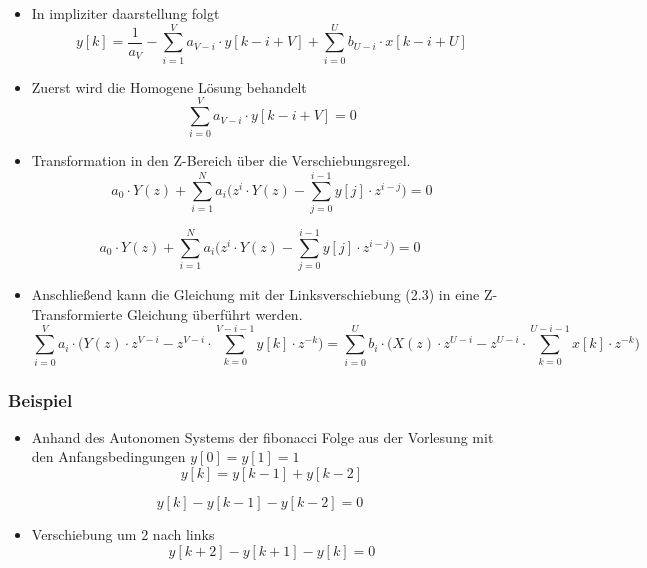 \documentclass[11pt]{article}
\providecommand{\tightlist}{%
      \setlength{\itemsep}{0pt}\setlength{\parskip}{0pt}}
\begin{document}
    \begin{itemize}
\tightlist
\item
  In impliziter daarstellung folgt \[
  y[k] 
  = \frac{1}{a_V} 
  - \sum_{i = 1}^V a_{V-i} \cdot y[k-i+V]
  + \sum_{i = 0}^U b_{U-i} \cdot x[k-i+U]
  \]
\end{itemize}

    \begin{itemize}
\tightlist
\item
  Zuerst wird die Homogene Lösung behandelt \[
  \sum_{i = 0}^V a_{V-i} \cdot y[k-i+V] = 0
  \]
\end{itemize}

    \begin{itemize}
\tightlist
\item
  Transformation in den Z-Bereich über die Verschiebungsregel. \[
  a_0 \cdot Y(z) + \sum_{i = 1}^{N} a_i \big( z^{i} \cdot Y(z) 
  - \sum_{j = 0}^{i - 1} y[j] \cdot z^{i-j} \big) 
  = 0
  \]
\end{itemize}

    \[
    a_0 \cdot Y(z) 
    + \sum_{i = 1}^{N} a_i \big( z^{i} \cdot Y(z) 
    - \sum_{j = 0}^{i - 1} y[j] \cdot z^{i-j} \big) 
    = 0
\]

    \begin{itemize}
\tightlist
\item
  Anschließend kann die Gleichung mit der Linksverschiebung (2.3) in
  eine Z-Transformierte Gleichung überführt werden.
  \[\sum_{i=0}^V a_i \cdot \big(Y(z) \cdot z^{V-i} - z^{V-i} \cdot \sum_{k = 0}^{V-i-1} y[k] \cdot z^{-k}\big) = \sum_{i=0}^U b_i \cdot \big(X(z) \cdot z^{U-i} - z^{U-i} \cdot \sum_{k = 0}^{U-i-1} x[k] \cdot z^{-k}\big)\]
\end{itemize}

    \subsubsection{Beispiel}\label{beispiel}

\begin{itemize}
\tightlist
\item
  Anhand des Autonomen Systems der fibonacci Folge aus der Vorlesung mit
  den Anfangsbedingungen \(y[0] = y[1] = 1\) \[y[k] = y[k-1] + y[k-2] \]
\end{itemize}

    \[ y[k] - y[k-1] - y[k-2] = 0\]

    \begin{itemize}
\tightlist
\item
  Verschiebung um \(2\) nach links \[ y[k+2] - y[k+1] - y[k] = 0\]
\end{itemize}
\end{document}
